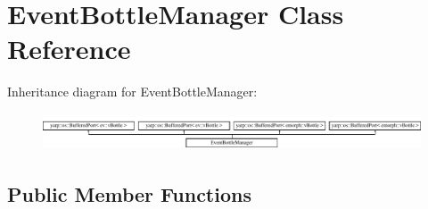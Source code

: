 \hypertarget{classEventBottleManager}{}\section{Event\+Bottle\+Manager Class Reference}
\label{classEventBottleManager}
Inheritance diagram for Event\+Bottle\+Manager\+:\begin{figure}[H]
\begin{center}
\leavevmode
\includegraphics[height=1.106719cm]{classEventBottleManager}
\end{center}
\end{figure}
\subsection*{Public Member Functions}
